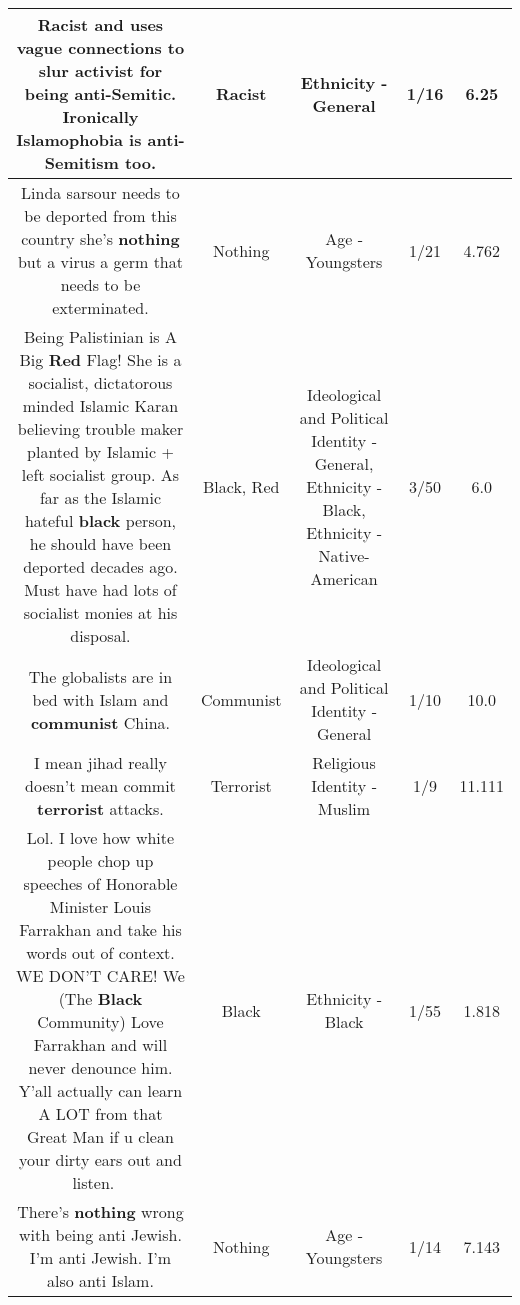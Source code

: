 \documentclass[11pt]{article}
\newlength\mylength
\begin{document}
\begin{center}
\begin{longtable}{|C{.65\mylength}|C{.30\mylength}|C{.12\mylength}|C{.12\mylength}|C{.12\mylength}|}
  \small Racist and uses vague connections to slur activist for being anti-Semitic. Ironically Islamophobia is anti-Semitism too.\normalsize   & Racist & Ethnicity - General & 1/16 & 6.25 \\  \hline
  \small Linda sarsour needs to be deported from this country she's \textbf{nothing} but a virus a germ that needs to be exterminated.\normalsize   & Nothing & Age - Youngsters & 1/21 & 4.762 \\  \hline
  \small Being Palistinian is A Big \textbf{R\textbf{ed}} Flag! She is a socialist, dictatorous minded Islamic Karan believing trouble maker planted by Islamic + left socialist group.  As far as the Islamic hateful \textbf{black} person, he should have been deported decades ago. Must have had lots of socialist monies at his disposal.\normalsize   & Black, Red &  Ideological and Political Identity - General, Ethnicity - Black, Ethnicity - Native-American & 3/50 & 6.0 \\  \hline
  \small The globalists are in bed with Islam and \textbf{communist} China.\normalsize   & Communist &  Ideological and Political Identity - General & 1/10 & 10.0 \\  \hline
  \small I mean jihad really doesn't mean commit \textbf{terrorist} attacks.\normalsize   & Terrorist & Religious Identity - Muslim & 1/9 & 11.111 \\  \hline
  \small Lol. I love how white people chop up speeches of Honorable Minister Louis Farrakhan and take his words out of context. WE DON'T CARE! We (The \textbf{Black} Community) Love Farrakhan and will never denounce him.  Y'all actually can learn A LOT from that Great Man if u clean your dirty ears out and listen. ✊🏾\normalsize   & Black & Ethnicity - Black & 1/55 & 1.818 \\  \hline
  \small There's \textbf{nothing} wrong with being anti Jewish. I'm anti Jewish. I'm also anti Islam.\normalsize   & Nothing & Age - Youngsters & 1/14 & 7.143 \\  \hline

\end{longtable}
\end{center}
\end{document}
